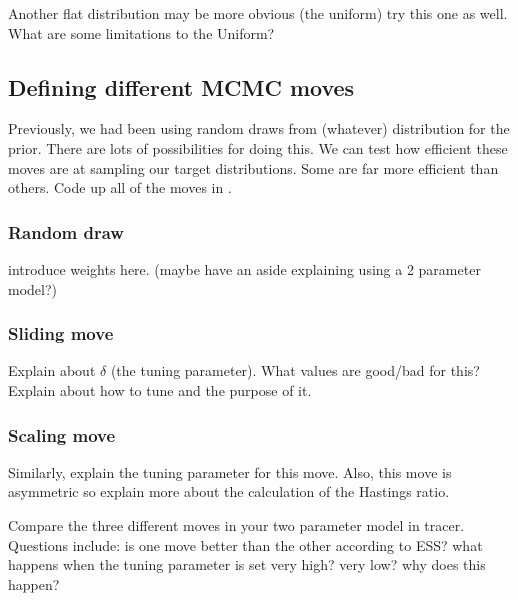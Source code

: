 Another flat distribution may be more obvious (the uniform) try this one as well. What are some limitations to the Uniform? 



\subsection{Defining different MCMC moves}

Previously, we had been using random draws from (whatever) distribution for the prior. There are lots of possibilities for doing this. We can test how efficient these moves are at sampling our target distributions. Some are far more efficient than others. Code up all of the moves in \RevBayes.

\subsubsection{Random draw}
introduce weights here. (maybe have an aside explaining using a 2 parameter model?)
\subsubsection{Sliding move}
Explain about $\delta$ (the tuning parameter). What values are good/bad for this? Explain about how to tune and the purpose of it.

\subsubsection{Scaling move}
Similarly, explain the tuning parameter for this move. Also, this move is asymmetric so explain more about the calculation of the Hastings ratio. 

Compare the three different moves in your two parameter model in tracer. Questions include: is one move better than the other according to ESS? what happens when the tuning parameter is set very high? very low? why does this happen? 


